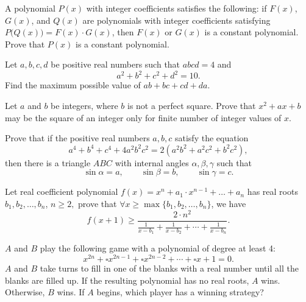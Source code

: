 \begin{question}[name={2011 Czech and Slovak}]
    A polynomial $P(x)$ with integer coefficients satisfies the following: if $F(x)$, $G(x)$, and $Q(x)$ are polynomials with integer coefficients satisfying $P\Big(Q(x)\Big)=F(x)\cdot G(x)$, then $F(x)$ or $G(x)$ is a constant polynomial. Prove that $P(x)$ is a constant polynomial.
\end{question}

\begin{question}[name={2012 Czech and Slovak}]
    Let $a,b,c,d$ be positive real numbers such that $abcd=4$ and
    \[a^2+b^2+c^2+d^2=10.\]
    Find the maximum possible value of $ab+bc+cd+da$.
\end{question}


\begin{question}[name={2013 Czech and Slovak}]
    Let $a$ and $b$ be integers, where $b$ is not a perfect square. Prove that $x^2 + ax + b$ may be the square of an integer only for finite number of integer values of $x$.
\end{question}


\begin{question}[name={2014 Czech and Slovak}]
    Prove that if the positive real numbers $a, b, c$ satisfy the equation
    \[a^4 + b^4 + c^4 + 4a^2b^2c^2 = 2 (a^2b^2 + a^2c^2 + b^2c^2),\]
    then there is a triangle $ABC$ with internal angles $\alpha, \beta, \gamma$ such that
    \[\sin \alpha = a, \qquad \sin \beta = b, \qquad \sin  \gamma= c.\]
\end{question}



\begin{question}[name={1991 China TST}]
    Let real coefficient polynomial $f(x) = x^n + a_1 \cdot x^{n-1} + \ldots + a_n$ has real roots $b_1, b_2, \dots, b_n$, $n \geq 2,$ prove that $\forall x \geq \max\{b_1, b_2, \ldots, b_n\}$, we have
    \[f(x+1) \geq \frac{2 \cdot n^2}{\displaystyle \frac{1}{x-b_1} + \frac{1}{x-b_2} + \cdots + \frac{1}{x-b_n}}.\]
\end{question}



\begin{question}[name={1995 China TST}]
    $ A$ and $ B$ play the following game with a polynomial of degree at least 4: \[ x^{2n} + \square x^{2n - 1} +  \square x^{2n - 2} + \cdots + \square x + 1 = 0.\]
    $A$ and $B$ take turns to fill in one of the blanks with a real number until all the blanks are filled up. If the resulting polynomial has no real roots, $A$ wins. Otherwise, $B$ wins. If $A$ begins, which player has a winning strategy?
\end{question}



